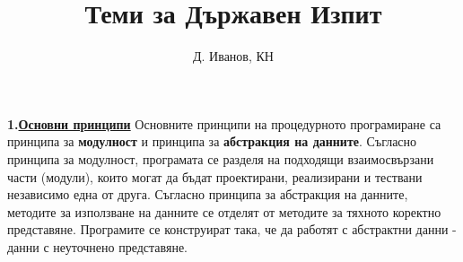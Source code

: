 \documentclass{article}
\begin{document}

\newcommand{\cppkw}[1]{\textcolor{blue}{\texttt{#1}}}
\newcommand{\cppplain}[1]{\textcolor{black}{\texttt{#1}}}
\newcommand{\cpptype}[1]{\textcolor{cppTypeColor}{\texttt{#1}}}

\title{Теми за Държавен Изпит}
\author{Д. Иванов, КН}
\maketitle

\section*{\centering \color{bordeaux}{Процедурно програмиране}}

\subsection*{\color{bordeaux}{14. Процедурно програмиране – основни конструкции.}}

\textbf{1.\underline{Основни принципи}} \newline\newline
Основните принципи на процедурното програмиране са принципа за \textbf{модулност} и принципа за \textbf{абстракция на данните}. Съгласно принципа
за модулност, програмата се разделя на подходящи взаимосвързани части (модули), които могат да бъдат проектирани, реализирани и тествани независимо
една от друга. Съгласно принципа за абстракция на данните, методите за използване на данните се отделят от методите за тяхното коректно
представяне. Програмите се конструират така, че да работят с абстрактни данни - данни с неуточнено представяне. 
\end{document}
